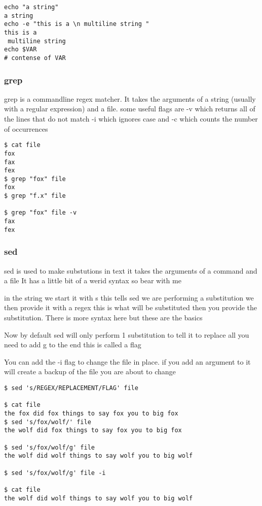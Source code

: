 \documentclass[a4paper]{article}
\begin{document}
\begin{verbatim}
echo "a string"
a string
echo -e "this is a \n multiline string "
this is a
 multiline string
echo $VAR
# contense of VAR
\end{verbatim}
\subsubsection*{grep}
\label{sec:org24fb0b4}
\begin{notes}
	grep is a commandline regex matcher. It takes the arguments of a string (usually
	with a regular expression) and a file.
	some useful flags are -v which returns all of the lines that do not match -i
	which ignores case and -c which counts the number of occurrences
\end{notes}

\begin{verbatim}
$ cat file
fox
fax
fex
$ grep "fox" file
fox
$ grep "f.x" file

$ grep "fox" file -v
fax
fex
\end{verbatim}
\subsubsection*{sed}
\label{sec:org6ca8ac3}
\begin{notes}
	sed is used to make substutions in text it takes the arguments of a command and
	a file It has a little bit of a werid syntax so bear with me

	in the string we start it with s this tells sed we are performing a substitution
	we then provide it with a regex this is what will be substituted then you
	provide the substitution. There is more syntax here but these are the basics

	Now by default sed will only perform 1 substitution to tell it to replace all
	you need to add g to the end this is called a flag

	You can add the -i flag to change the file in place. if you add an argument to
	it will create a backup of the file you are about to change
\end{notes}

\begin{verbatim}
$ sed 's/REGEX/REPLACEMENT/FLAG' file

$ cat file
the fox did fox things to say fox you to big fox
$ sed 's/fox/wolf/' file
the wolf did fox things to say fox you to big fox

$ sed 's/fox/wolf/g' file
the wolf did wolf things to say wolf you to big wolf

$ sed 's/fox/wolf/g' file -i

$ cat file
the wolf did wolf things to say wolf you to big wolf
\end{verbatim}
\end{document}
